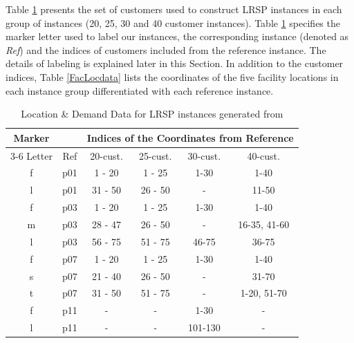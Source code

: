 Table \ref{Locationdata} presents the set of customers used to construct LRSP
instances in each group of instances (20, 25, 30 and 40 customer instances).
Table \ref{Locationdata} specifies the marker letter used to label our instances,
the corresponding \citet{Cordeau} instance (denoted as {\em Ref}) and the indices
of customers included from the reference instance.
The details of labeling is explained later in this Section.
In addition to the customer indices, Table \ref{FacLocdata} lists the coordinates of the
five facility locations in each instance group differentiated with each reference
instance.
\begin {table}[h]
\begin{center}
\caption {Location \& Demand Data for LRSP instances generated from \citet{Cordeau}} \label{Locationdata}
\begin {tabular}[h]{|c|c|c|c|c|c|} \hline
Marker  & \mbox{} & \multicolumn{4}{|c|}{Indices of the Coordinates from Reference} \\\cline{3-6}
Letter  & Ref     & 20-cust. &  25-cust. &  30-cust.&  40-cust. \\\hline
f & p01 & 1 - 20  & 1 - 25   & 1-30 & 1-40       \\
l & p01 & 31 - 50 & 26 - 50  & -    & 11-50      \\\hline
f & p03 & 1 - 20  & 1 - 25   & 1-30 & 1-40        \\
m & p03 & 28 - 47 & 26 - 50  & -    & 16-35, 41-60 \\
l & p03 & 56 - 75 & 51 - 75  & 46-75    & 36-75       \\\hline
f & p07 & 1 - 20  & 1 - 25   & 1-30 & 1-40        \\
s & p07 & 21 - 40 & 26 - 50  & -    & 31-70       \\
t & p07 & 31 - 50 & 51 - 75  & -    & 1-20, 51-70 \\\hline
f & p11 & -   & -        & 1-30 & -           \\
l & p11 & -   & -        & 101-130  & -           \\\hline
\end{tabular}
\end{center}
\end{table}


